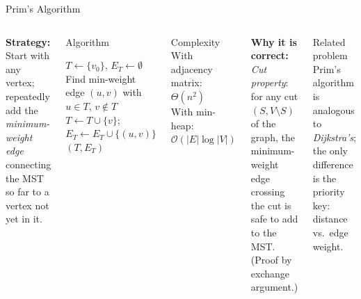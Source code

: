 \documentclass[aspectratio=169]{beamer}
\begin{document}
\begin{frame}[shrink=12]{Prim's Algorithm}
  \begin{columns}[T]
      \textbf{Strategy:} Start with any vertex; repeatedly add the
      \emph{minimum-weight edge} connecting the MST so far to a vertex
      not yet in it.

      \vspace{0.3em}
      \begin{block}{Algorithm}
        \begin{algorithmic}[1]
          \State $T \gets \{v_0\}$, $E_T \gets \emptyset$
            \State Find min-weight edge $(u,v)$ with
                   $u \in T$, $v \notin T$
            \State $T \gets T \cup \{v\}$;\;
                   $E_T \gets E_T \cup \{(u,v)\}$
          \EndWhile
          \State \Return $(T, E_T)$
        \end{algorithmic}
      \end{block}
      \begin{alertblock}{Complexity}
        With adjacency matrix: $\Theta(n^2)$\\
        With min-heap: $\mathcal{O}(|E|\log|V|)$
      \end{alertblock}
      \vspace{0.3em}
      \textbf{Why it is correct:} \emph{Cut property}:
      for any cut $(S, V\setminus S)$ of the graph, the minimum-weight
      edge crossing the cut is safe to add to the MST.
      (Proof by exchange argument.)

      \vspace{0.3em}
      \begin{exampleblock}{Related problem}
        Prim's algorithm is analogous to \emph{Dijkstra's}; the only
        difference is the priority key: distance vs.\ edge weight.
      \end{exampleblock}
  \end{columns}
\end{frame}
\end{document}
